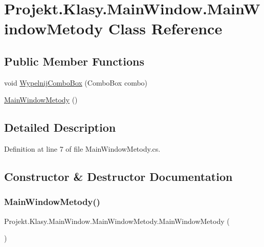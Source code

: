 \hypertarget{class_projekt_1_1_klasy_1_1_main_window_1_1_main_window_metody}{}\section{Projekt.\+Klasy.\+Main\+Window.\+Main\+Window\+Metody Class Reference}
\label{class_projekt_1_1_klasy_1_1_main_window_1_1_main_window_metody}
\subsection*{Public Member Functions}
\begin{DoxyCompactItemize}
\item 
void \mbox{\hyperlink{class_projekt_1_1_klasy_1_1_main_window_1_1_main_window_metody_a0949895d8b695fb1ae87b383df0ee915}{Wypelnij\+Combo\+Box}} (Combo\+Box combo)
\item 
\mbox{\hyperlink{class_projekt_1_1_klasy_1_1_main_window_1_1_main_window_metody_a1e543a568db4164bd4780bfb99ad8be3}{Main\+Window\+Metody}} ()
\end{DoxyCompactItemize}


\subsection{Detailed Description}


Definition at line 7 of file Main\+Window\+Metody.\+cs.



\subsection{Constructor \& Destructor Documentation}
\mbox{\label{class_projekt_1_1_klasy_1_1_main_window_1_1_main_window_metody_a1e543a568db4164bd4780bfb99ad8be3}} 
\subsubsection{\texorpdfstring{MainWindowMetody()}{MainWindowMetody()}}
{\footnotesize\ttfamily Projekt.\+Klasy.\+Main\+Window.\+Main\+Window\+Metody.\+Main\+Window\+Metody (\begin{DoxyParamCaption}{ }\end{DoxyParamCaption})}



